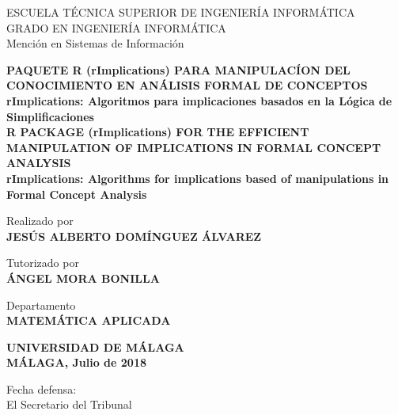 \newpage
\thispagestyle{empty}
\mbox{}
\newpage
\thispagestyle{empty}
\mbox{}

\begin{titlepage}

    \begin{center}
		\normalsize {
            ESCUELA T\'ECNICA SUPERIOR DE INGENIER\'IA INFORM\'ATICA \\
            GRADO EN INGENIER\'IA INFORM\'ATICA \\
            Menci\'on en Sistemas de Informaci\'on \\}
	\end{center}

    \bigskip

    \begin{center}
		\normalsize {\textbf{
            PAQUETE R (rImplications) PARA MANIPULAC\'ION DEL CONOCIMIENTO 
            EN AN\'ALISIS FORMAL DE CONCEPTOS\\ 
            rImplications: Algoritmos para implicaciones basados
            en la L\'ogica de Simplificaciones\\ 
            R PACKAGE (rImplications) FOR THE EFFICIENT MANIPULATION OF
            IMPLICATIONS IN FORMAL CONCEPT ANALYSIS \\
            rImplications: Algorithms for implications based
            of manipulations in Formal Concept Analysis
            }}
    \end{center}
    
    \smallskip

    \begin{center}
		\normalsize {
            Realizado por \\ \textbf{JES\'US ALBERTO DOM\'INGUEZ \'ALVAREZ}}
    \end{center}

    \begin{center}
		\normalsize {
            Tutorizado por \\ \textbf{\'ANGEL MORA BONILLA}}
    \end{center}

    \begin{center}
		\normalsize {
            Departamento \\ \textbf{MATEM\'ATICA APLICADA}}
    \end{center}

    \begin{center}
		\normalsize {
            \textbf{UNIVERSIDAD DE M\'ALAGA \\ M\'ALAGA, Julio de 2018}}
    \end{center}

    \bigskip

    \bigskip

    \begin{flushleft}
		\normalsize {
            Fecha defensa: \\ El Secretario del Tribunal}
    \end{flushleft}

\end{titlepage}

\newpage
\thispagestyle{empty}
\mbox{}

\newpage